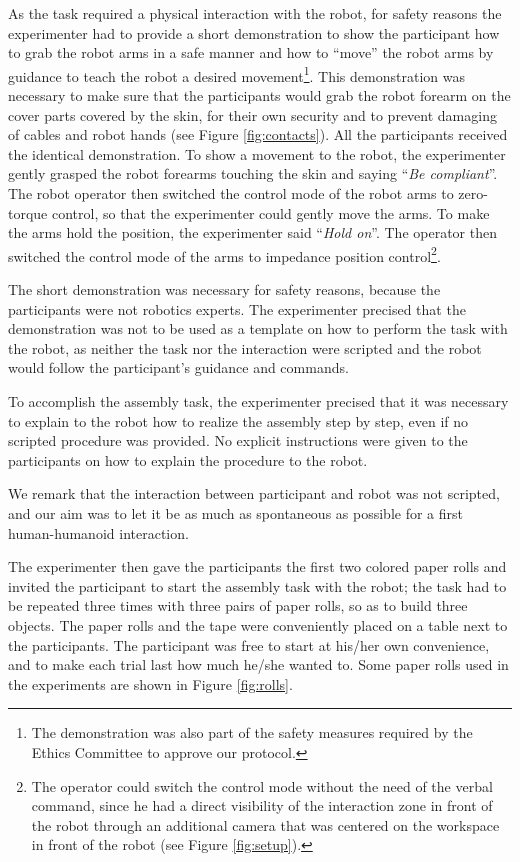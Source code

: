 As the task required a physical interaction with the robot, for safety reasons the experimenter had to provide a short demonstration to show the participant how to grab the robot arms in a safe manner and how to ``move'' the robot arms by guidance to teach the robot a desired movement\footnote{The demonstration was also part of the safety measures required by the Ethics Committee to approve our protocol.}.
This demonstration was necessary to make sure that the participants would grab the robot forearm on the cover parts covered by the skin, for their own security and to prevent damaging of cables and robot hands (see Figure \ref{fig:contacts}).
All the participants received the identical demonstration. 
To show a movement to the robot, the experimenter gently grasped the robot forearms touching the skin and saying ``\textit{Be compliant}''. The robot operator then switched the control mode of the robot arms to zero-torque control, so that the experimenter could gently move the arms. To make the arms hold the position, the experimenter said ``\textit{Hold on}''. The operator then switched the control mode of the arms to impedance position control\footnote{The operator could switch the control mode without the need of the verbal command, since he had a direct visibility of the interaction zone in front of the robot through an additional camera that was centered on the workspace in front of the robot (see Figure \ref{fig:setup}).}. 

The short demonstration was necessary for safety reasons, because the participants were not robotics experts.
The experimenter precised that the demonstration was not to be used as a template on how to perform the task with the robot, as neither the task nor the interaction were scripted and the robot would follow the participant's guidance and commands. 


To accomplish the assembly task, the experimenter precised that it was necessary to explain  to the robot how to realize the assembly step by step, even if no scripted procedure was provided. No explicit instructions were given to the participants on how to explain the procedure to the robot.

We remark that the interaction between participant and robot was not scripted, and our aim was to let it be as much as spontaneous as possible for a first human-humanoid interaction.

The experimenter then gave the participants the first two colored paper rolls and invited the participant to start the assembly task with the robot; the task had to be repeated three times with three pairs of paper rolls, so as to build three objects. The paper rolls and the tape were conveniently placed on a table next to the participants.
The participant was free to start at his/her own convenience, and to make each trial last how much he/she wanted to.
Some paper rolls used in the experiments are shown in Figure \ref{fig:rolls}.


